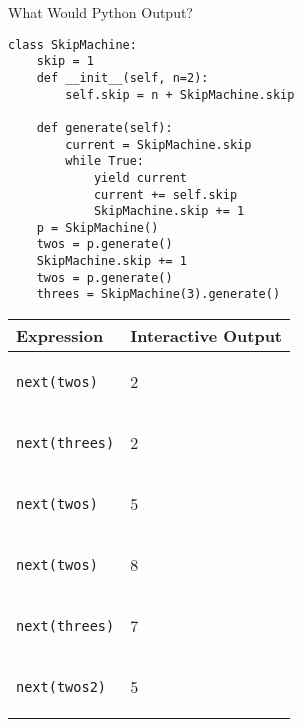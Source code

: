 \question What Would Python Output?
\begin{lstlisting}
class SkipMachine:
    skip = 1
    def __init__(self, n=2):
        self.skip = n + SkipMachine.skip

    def generate(self):
        current = SkipMachine.skip
        while True:
            yield current
            current += self.skip
            SkipMachine.skip += 1
    p = SkipMachine()
    twos = p.generate()
    SkipMachine.skip += 1
    twos = p.generate()
    threes = SkipMachine(3).generate()
\end{lstlisting}
\begin{tabular}{|p{5cm}|p{5cm}|}
\hline
\textbf{Expression} & \textbf{Interactive Output}\\\hline
\begin{lstlisting}
next(twos)
\end{lstlisting} & \begin{solution}
2
\end{solution}\\ \hline
\begin{lstlisting}
next(threes)
\end{lstlisting} & \begin{solution}
2
\end{solution} \\ \hline
\begin{lstlisting}
next(twos)
\end{lstlisting} & \begin{solution}
5
\end{solution} \\ \hline
\begin{lstlisting}
next(twos)
\end{lstlisting} & \begin{solution}
8
\end{solution} \\ \hline
\begin{lstlisting}
next(threes)
\end{lstlisting} & \begin{solution}
7
\end{solution} \\ \hline
\begin{lstlisting}
next(twos2)
\end{lstlisting} &  \begin{solution}
5
\end{solution}\\ \hline
\end{tabular}
